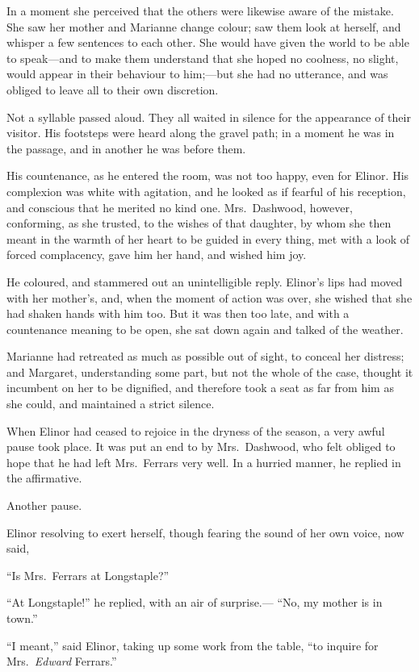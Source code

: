 \documentclass{article}
\begin{document}
In a moment she perceived that the others were likewise
aware of the mistake.  She saw her mother and Marianne
change colour; saw them look at herself, and whisper
a few sentences to each other.  She would have given
the world to be able to speak---and to make them understand
that she hoped no coolness, no slight, would appear
in their behaviour to him;---but she had no utterance,
and was obliged to leave all to their own discretion.

Not a syllable passed aloud.  They all waited
in silence for the appearance of their visitor.
His footsteps were heard along the gravel path; in a moment
he was in the passage, and in another he was before them.

His countenance, as he entered the room, was not
too happy, even for Elinor.  His complexion was white
with agitation, and he looked as if fearful of his
reception, and conscious that he merited no kind one.
Mrs.\ Dashwood, however, conforming, as she trusted,
to the wishes of that daughter, by whom she then meant
in the warmth of her heart to be guided in every thing,
met with a look of forced complacency, gave him her hand,
and wished him joy.

He coloured, and stammered out an unintelligible reply.
Elinor's lips had moved with her mother's, and, when the
moment of action was over, she wished that she had shaken
hands with him too.  But it was then too late, and with a
countenance meaning to be open, she sat down again
and talked of the weather.

Marianne had retreated as much as possible
out of sight, to conceal her distress; and Margaret,
understanding some part, but not the whole of the case,
thought it incumbent on her to be dignified, and therefore
took a seat as far from him as she could, and maintained
a strict silence.

When Elinor had ceased to rejoice in the dryness
of the season, a very awful pause took place.  It was put
an end to by Mrs.\ Dashwood, who felt obliged to hope that he
had left Mrs.\ Ferrars very well.  In a hurried manner,
he replied in the affirmative.

Another pause.

Elinor resolving to exert herself, though fearing
the sound of her own voice, now said,

``Is Mrs.\ Ferrars at Longstaple?''

``At Longstaple!'' he replied, with an air of surprise.---%
``No, my mother is in town.''

``I meant,'' said Elinor, taking up some work from
the table, ``to inquire for Mrs.\ \emph{Edward} Ferrars.''
\end{document}
